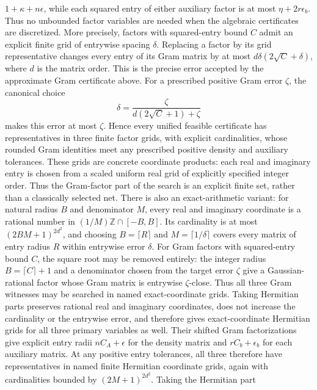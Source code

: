 \begin{lemma}
    $1+\kappa+n\epsilon$, while each squared entry of either auxiliary factor
    is at most $\eta+2r\epsilon_b$.  Thus no unbounded factor variables are
    needed when the algebraic certificates are discretized.  More precisely,
    factors with squared-entry bound $C$ admit an explicit finite grid of
    entrywise spacing $\delta$.  Replacing a factor by its grid representative
    changes every entry of its Gram matrix by at most
    $d\delta(2\sqrt C+\delta)$, where $d$ is the matrix order.  This is the
    precise error accepted by the approximate Gram certificate above.  For a
    prescribed positive Gram error $\zeta$, the canonical choice
    \[
        \delta=\frac{\zeta}{d(2\sqrt C+1)+\zeta}
    \]
    makes this error at most $\zeta$.  Hence every unified feasible certificate
    has representatives in three finite factor grids, with explicit
    cardinalities, whose rounded Gram identities meet any prescribed positive
    density and auxiliary tolerances.  These grids are concrete coordinate
    products: each real and imaginary entry is chosen from a scaled uniform
    real grid of explicitly specified integer order.  Thus the Gram-factor
    part of the search is an explicit finite set, rather than a classically
    selected net.  There is also an exact-arithmetic variant: for natural
    radius $B$ and denominator $M$, every real and imaginary coordinate is a
    rational number in $(1/M)\mathbb Z\cap[-B,B]$.  Its cardinality is at most
    $(2BM+1)^{2d^2}$, and choosing $B=\lceil R\rceil$ and
    $M=\lceil1/\delta\rceil$ covers every matrix of entry radius $R$ within
    entrywise error $\delta$.  For Gram factors with squared-entry bound $C$,
    the square root may be removed entirely: the integer radius
    $B=\lceil C\rceil+1$ and a denominator chosen from the target error
    $\zeta$ give a Gaussian-rational factor whose Gram matrix is entrywise
    $\zeta$-close.  Thus all three Gram witnesses may be searched in named
    exact-coordinate grids.  Taking Hermitian parts preserves rational real
    and imaginary coordinates, does not increase the cardinality or the
    entrywise error, and therefore gives exact-coordinate Hermitian grids for
    all three primary variables as well.
    Their shifted Gram factorizations give explicit entry radii
    $nC_A+\epsilon$ for the density matrix and $rC_b+\epsilon_b$ for each
    auxiliary matrix.  At any positive entry tolerances, all three therefore
    have representatives in named finite Hermitian coordinate grids, again
    with cardinalities bounded by $(2M+1)^{2d^2}$.  Taking the Hermitian part

\end{lemma}
